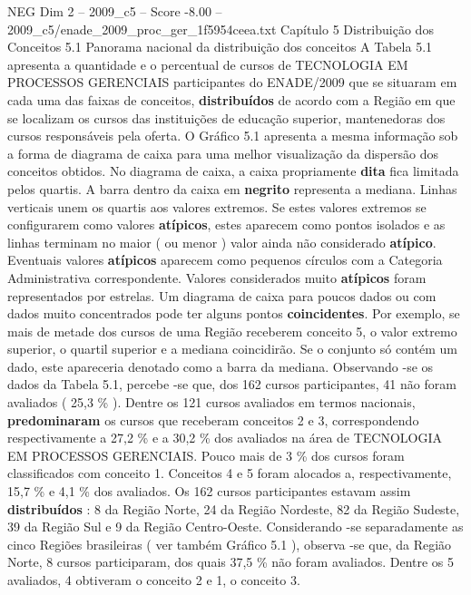 \begin{textsample}{NEG Dim 2 – 2009\_c5 – Score -8.00 – 2009\_c5/enade\_2009\_proc\_ger\_1f5954ceea.txt}  \label{ex:f2_neg_009}
Capítulo 5 Distribuição dos Conceitos 5.1 Panorama nacional da distribuição dos conceitos A Tabela 5.1 apresenta a quantidade e o percentual de cursos de TECNOLOGIA EM PROCESSOS GERENCIAIS participantes do ENADE/2009 que se situaram em cada uma das faixas de conceitos, \textbf{distribuídos} de acordo com a Região em que se localizam os cursos das instituições de educação superior, mantenedoras dos cursos responsáveis pela oferta.
O Gráfico 5.1 apresenta a mesma informação sob a forma de diagrama de caixa para uma melhor visualização da dispersão dos conceitos obtidos.
No diagrama de caixa, a caixa propriamente \textbf{dita} fica limitada pelos quartis.
A barra dentro da caixa em \textbf{negrito} representa a mediana.
Linhas verticais unem os quartis aos valores extremos.
Se estes valores extremos se configurarem como valores \textbf{atípicos}, estes aparecem como pontos isolados e as linhas terminam no maior ( ou menor ) valor ainda não considerado \textbf{atípico}.
Eventuais valores \textbf{atípicos} aparecem como pequenos círculos com a Categoria Administrativa correspondente.
Valores considerados muito \textbf{atípicos} foram representados por estrelas.
Um diagrama de caixa para poucos dados ou com dados muito concentrados pode ter alguns pontos \textbf{coincidentes}.
Por exemplo, se mais de metade dos cursos de uma Região receberem conceito 5, o valor extremo superior, o quartil superior e a mediana coincidirão.
Se o conjunto só contém um dado, este apareceria denotado como a barra da mediana.
Observando -se os dados da Tabela 5.1, percebe -se que, dos 162 cursos participantes, 41 não foram avaliados ( 25,3 \% ).
Dentre os 121 cursos avaliados em termos nacionais, \textbf{predominaram} os cursos que receberam conceitos 2 e 3, correspondendo respectivamente a 27,2 \% e a 30,2 \% dos avaliados na área de TECNOLOGIA EM PROCESSOS GERENCIAIS.
Pouco mais de 3 \% dos cursos foram classificados com conceito 1.
Conceitos 4 e 5 foram alocados a, respectivamente, 15,7 \% e 4,1 \% dos avaliados.
Os 162 cursos participantes estavam assim \textbf{distribuídos} : 8 da Região Norte, 24 da Região Nordeste, 82 da Região Sudeste, 39 da Região Sul e 9 da Região Centro-Oeste.
Considerando -se separadamente as cinco Regiões brasileiras ( ver também Gráfico 5.1 ), observa -se que, da Região Norte, 8 cursos participaram, dos quais 37,5 \% não foram avaliados.
Dentre os 5 avaliados, 4 obtiveram o conceito 2 e 1, o conceito 3.

\end{textsample}
